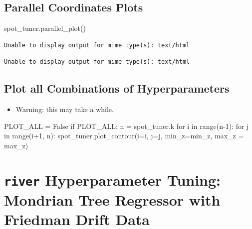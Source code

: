 \documentclass[
  letterpaper,
  DIV=11,
  numbers=noendperiod]{scrreprt}
\newenvironment{Shaded}{\begin{snugshade}}{\end{snugshade}}
\newcommand{\BuiltInTok}[1]{\textcolor[rgb]{0.00,0.23,0.31}{#1}}
\newcommand{\ControlFlowTok}[1]{\textcolor[rgb]{0.00,0.23,0.31}{#1}}
\newcommand{\DecValTok}[1]{\textcolor[rgb]{0.68,0.00,0.00}{#1}}
\newcommand{\KeywordTok}[1]{\textcolor[rgb]{0.00,0.23,0.31}{#1}}
\newcommand{\NormalTok}[1]{\textcolor[rgb]{0.00,0.23,0.31}{#1}}
\newcommand{\OperatorTok}[1]{\textcolor[rgb]{0.37,0.37,0.37}{#1}}
\newcommand{\VariableTok}[1]{\textcolor[rgb]{0.07,0.07,0.07}{#1}}
\providecommand{\tightlist}{%
  \setlength{\itemsep}{0pt}\setlength{\parskip}{0pt}}\usepackage{longtable,booktabs,array}
\begin{document}
\hypertarget{parallel-coordinates-plots}{%
\section{Parallel Coordinates Plots}\label{parallel-coordinates-plots}}

\begin{Shaded}
\begin{Highlighting}[]
\NormalTok{spot\_tuner.parallel\_plot()}
\end{Highlighting}
\end{Shaded}

\begin{verbatim}
Unable to display output for mime type(s): text/html
\end{verbatim}

\begin{verbatim}
Unable to display output for mime type(s): text/html
\end{verbatim}

\hypertarget{plot-all-combinations-of-hyperparameters-5}{%
\section{Plot all Combinations of
Hyperparameters}\label{plot-all-combinations-of-hyperparameters-5}}

\begin{itemize}
\tightlist
\item
  Warning: this may take a while.
\end{itemize}

\begin{Shaded}
\begin{Highlighting}[]
\NormalTok{PLOT\_ALL }\OperatorTok{=} \VariableTok{False}
\ControlFlowTok{if}\NormalTok{ PLOT\_ALL:}
\NormalTok{    n }\OperatorTok{=}\NormalTok{ spot\_tuner.k}
    \ControlFlowTok{for}\NormalTok{ i }\KeywordTok{in} \BuiltInTok{range}\NormalTok{(n}\OperatorTok{{-}}\DecValTok{1}\NormalTok{):}
        \ControlFlowTok{for}\NormalTok{ j }\KeywordTok{in} \BuiltInTok{range}\NormalTok{(i}\OperatorTok{+}\DecValTok{1}\NormalTok{, n):}
\NormalTok{            spot\_tuner.plot\_contour(i}\OperatorTok{=}\NormalTok{i, j}\OperatorTok{=}\NormalTok{j, min\_z}\OperatorTok{=}\NormalTok{min\_z, max\_z }\OperatorTok{=}\NormalTok{ max\_z)}
\end{Highlighting}
\end{Shaded}

\hypertarget{sec-river-hpt-51}{%
\chapter{\texorpdfstring{\texttt{river} Hyperparameter Tuning: Mondrian
Tree Regressor with Friedman Drift
Data}{river Hyperparameter Tuning: Mondrian Tree Regressor with Friedman Drift Data}}\label{sec-river-hpt-51}}
\end{document}
